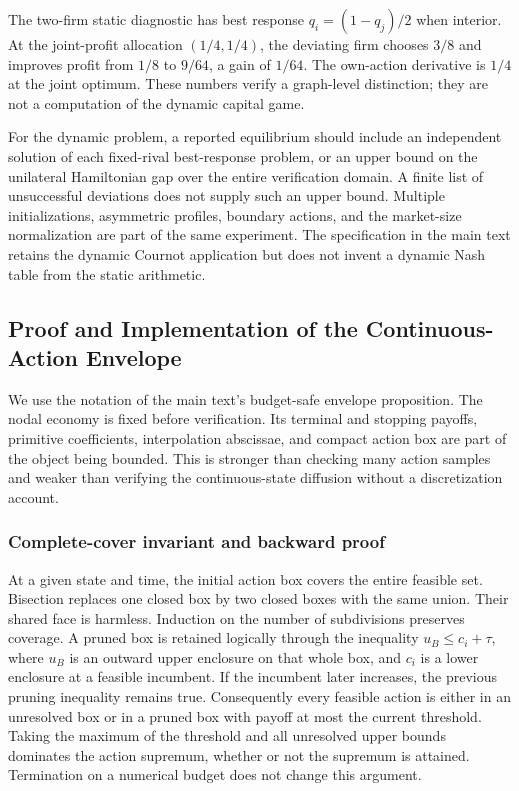 \documentclass[ecta,nameyear,draft]{econsocart}
\theoremstyle{definition}
\theoremstyle{remark}
\begin{document}
The two-firm static diagnostic has best response $q_i=(1-q_j)/2$ when interior. At the joint-profit allocation $(1/4,1/4)$, the deviating firm chooses $3/8$ and improves profit from $1/8$ to $9/64$, a gain of $1/64$. The own-action derivative is $1/4$ at the joint optimum. These numbers verify a graph-level distinction; they are not a computation of the dynamic capital game.

For the dynamic problem, a reported equilibrium should include an independent solution of each fixed-rival best-response problem, or an upper bound on the unilateral Hamiltonian gap over the entire verification domain. A finite list of unsuccessful deviations does not supply such an upper bound. Multiple initializations, asymmetric profiles, boundary actions, and the market-size normalization are part of the same experiment. The specification in the main text retains the dynamic Cournot application but does not invent a dynamic Nash table from the static arithmetic.

\subsection{Proof and Implementation of the Continuous-Action Envelope}\label{supp:r8-envelope}
We use the notation of the main text's budget-safe envelope proposition. The nodal economy is fixed before verification. Its terminal and stopping payoffs, primitive coefficients, interpolation abscissae, and compact action box are part of the object being bounded. This is stronger than checking many action samples and weaker than verifying the continuous-state diffusion without a discretization account.

\subsubsection{Complete-cover invariant and backward proof}
At a given state and time, the initial action box covers the entire feasible set. Bisection replaces one closed box by two closed boxes with the same union. Their shared face is harmless. Induction on the number of subdivisions preserves coverage. A pruned box is retained logically through the inequality $u_B\leq c_i+\tau$, where $u_B$ is an outward upper enclosure on that whole box, and $c_i$ is a lower enclosure at a feasible incumbent. If the incumbent later increases, the previous pruning inequality remains true. Consequently every feasible action is either in an unresolved box or in a pruned box with payoff at most the current threshold. Taking the maximum of the threshold and all unresolved upper bounds dominates the action supremum, whether or not the supremum is attained. Termination on a numerical budget does not change this argument.
\end{document}
